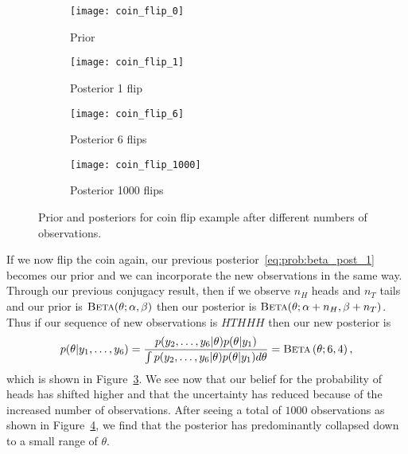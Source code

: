 \begin{figure}[t]
	\centering
	\begin{subfigure}[t]{0.24\textwidth}
			\hspace{-10pt}
		\texttt{[image: coin\_flip\_0]}
		\caption{Prior \label{fig:inf:coin_flip:0}}
	\end{subfigure}
	\begin{subfigure}[t]{0.24\textwidth}
			\hspace{-10pt}
		\texttt{[image: coin\_flip\_1]}
		\caption{Posterior 1 flip \label{fig:inf:coin_flip:1}}
	\end{subfigure}
		\hspace{-3pt}
	\begin{subfigure}[t]{0.24\textwidth}
		\texttt{[image: coin\_flip\_6]}
		\caption{Posterior 6 flips \label{fig:inf:coin_flip:6}}
	\end{subfigure}
	\hspace{3pt}
	\begin{subfigure}[t]{0.24\textwidth}
		\texttt{[image: coin\_flip\_1000]}
		\caption{Posterior 1000 flips \label{fig:inf:coin_flip:1000}}
	\end{subfigure}
	\caption{Prior and posteriors for coin flip example after different numbers
		of observations. \vspace{-5pt}
		\label{fig:inf:coin_flip}}
\end{figure}

If we now flip the coin again, our previous posterior~\eqref{eq:prob:beta_post_1} becomes our
prior and we can incorporate the new observations in the same way.  
Through our previous conjugacy result, then if we observe $n_{H}$ heads
and $n_{T}$ tails and our prior is $\textsc{Beta}(\theta ; \alpha, \beta)$ then our posterior is
$\textsc{Beta}(\theta ; \alpha+n_H, \beta+n_T)$.
Thus if our sequence of new
observations is $HTHHH$ then our new posterior is
\begin{align}
p(\theta | y_1,\dots,y_6) = \frac{p(y_2,\dots,y_6 | \theta)p(\theta | y_1)}
{\int p(y_2,\dots,y_6 | \theta)p(\theta | y_1) d\theta} = \textsc{Beta}\left(\theta ; 6,4\right),
\end{align}
which is shown in Figure~\ref{fig:inf:coin_flip:6}.  We see now that our belief for the probability of heads
has shifted higher and that the uncertainty has reduced because of the increased number
of observations.
After seeing a total of $1000$ observations as shown in Figure~\ref{fig:inf:coin_flip:1000}, we
find that the posterior has predominantly collapsed down to a small range of $\theta$.

